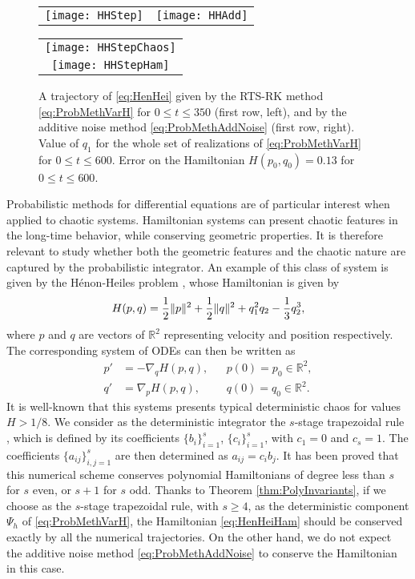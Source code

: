 \documentclass{siamart1116}
\numberwithin{theorem}{section}
\DeclarePairedDelimiter{\norm}{\|}{\|}
\newcommand{\R}{\mathbb{R}}
\newcommand{\corr}[1]{{\color{bordeaux}#1}}
\begin{document}
\begin{figure}[t!]
	\begin{center}
		\begin{tabular}{cc}
			\texttt{[image: HHStep]} & \texttt{[image: HHAdd]} \\
		\end{tabular}
		\begin{tabular}{c}
			\texttt{[image: HHStepChaos]} \\
			\texttt{[image: HHStepHam]}
		\end{tabular}
	\end{center}
	\caption{A trajectory of \eqref{eq:HenHei} given by \corr{the RTS-RK method} \eqref{eq:ProbMethVarH} for $0 \leq t \leq 350$ (first row, left), and by \corr{the additive noise method} \eqref{eq:ProbMethAddNoise} (first row, right). Value of $q_1$ for the whole set of realizations of \eqref{eq:ProbMethVarH} for $0 \leq t \leq 600$. Error on the Hamiltonian $H(p_0, q_0) = 0.13$ for $0 \leq t \leq 600$.}
	\label{fig:HH}
\end{figure}

Probabilistic methods for differential equations are of particular interest when applied to chaotic systems. Hamiltonian systems can present chaotic features in the long-time behavior, while conserving geometric properties. It is therefore relevant to study whether both the geometric features and the chaotic nature are captured by the probabilistic integrator. An example of this class of system is given by the Hénon-Heiles problem \cite{HeH64}, whose Hamiltonian is given by
\begin{equation}\label{eq:HenHeiHam}
	H(p, q) = \frac{1}{2}\norm{p}^2 + \frac{1}{2}\norm{q}^2 + q_1^2q_2 - \frac{1}{3}q_2^3,
\end{equation}
where $p$ and $q$ are vectors of $\R^2$ representing velocity and position respectively. The corresponding system of ODEs can then be written as
\begin{equation}\label{eq:HenHei}
\begin{aligned}
	p' &= -\nabla_q H(p, q), &&p(0) = p_0 \in \R^2,\\
	q' &= \nabla_p H(p, q), &&q(0) = q_0 \in \R^2.
\end{aligned}
\end{equation}
It is well-known that this systems presents typical deterministic chaos for values $H > 1/8$. We consider as the deterministic integrator the $s$-stage trapezoidal rule \cite{IaT09}, which is defined by its coefficients $\{b_i\}_{i=1}^s$, $\{c_i\}_{i=1}^s$, with $c_1 = 0$ and $c_s = 1$. The coefficients $\{a_{ij}\}_{i,j=1}^s$ are then determined as $a_{ij} = c_ib_j$. It has been proved that this numerical scheme conserves polynomial Hamiltonians of degree less than $s$ for $s$ even, or $s + 1$ for $s$ odd. Thanks to Theorem \ref{thm:PolyInvariants}, if we choose as the $s$-stage trapezoidal rule, with $s \geq 4$, as the deterministic component $\Psi_h$ of \eqref{eq:ProbMethVarH}, the Hamiltonian \eqref{eq:HenHeiHam} should be conserved exactly by all the numerical trajectories. On the other hand, we do not expect the additive noise method \eqref{eq:ProbMethAddNoise} to conserve the Hamiltonian in this case.
\end{document}

